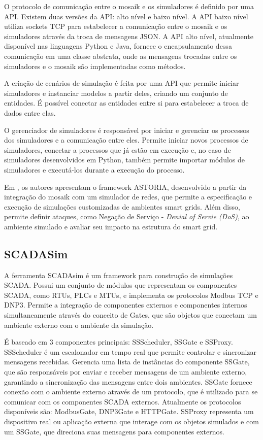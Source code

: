\documentclass[cic,tc]{iiufrgs}
\begin{document}
O protocolo de comunicação entre o mosaik e os simuladores é definido por uma API. Existem duas versões da API: alto nível e baixo nível. A API baixo nível utiliza sockets TCP para estabelecer a comunicação entre o mosaik e os simuladores através da troca de mensagens JSON. A API alto nível, atualmente disponível nas linguagens Python e Java, fornece o encapsulamento dessa comunicação em uma classe abstrata, onde as mensagens trocadas entre os simuladores e o mosaik são implementadas como métodos.

A criação de cenários de simulação é feita por uma API que permite iniciar simuladores e instanciar modelos a partir deles, criando um conjunto de entidades. É possível conectar as entidades entre si para estabelecer a troca de dados entre elas.

O gerenciador de simuladores é responsável por iniciar e gerenciar os processos dos simuladores e a comunicação entre eles. Permite iniciar novos processos de simuladores, conectar a processos que já estão em execução e, no caso de simuladores desenvolvidos em Python, também permite importar módulos de simuladores e executá-los durante a execução do processo.

Em \cite{wermann2015astoria}, os autores apresentam o framework ASTORIA, desenvolvido a partir da integração do mosaik com um simulador de redes, que permite a especificação e execução de simulações customizadas de ambientes smart grids. Além disso, permite definir ataques, como Negação de Serviço - \emph{Denial of Servie (DoS)}, ao ambiente simulado e avaliar seu impacto na estrutura do smart grid.

\subsection{SCADASim}
A ferramenta SCADAsim \cite{scadasimart} é um framework para construção de simulações SCADA. Possui um conjunto de módulos que representam os componentes SCADA, como RTUs, PLCs e MTUs, e implementa os protocolos Modbus TCP e DNP3. Permite a integração de componentes externos e componentes internos simultaneamente através do conceito de Gates, que são objetos que conectam um ambiente externo com o ambiente da simulação.

É baseado em 3 componentes principais: SSScheduler, SSGate e SSProxy.  SSScheduler é um escalonador em tempo real que permite controlar e sincronizar mensagens recebidas. Gerencia uma lista de instâncias do componente SSGate, que são responsáveis por enviar e receber mensagens de um ambiente externo, garantindo a sincronização das mensagens entre dois ambientes. SSGate fornece conexão com o ambiente externo através de um protocolo, que é utilizado para se comunicar com os componentes SCADA externos. Atualmente os protocolos disponíveis são: ModbusGate, DNP3Gate e HTTPGate. SSProxy representa um dispositivo real ou aplicação externa que interage com os objetos simulados e com um SSGate, que direciona suas mensagens para componentes externos.
\end{document}
